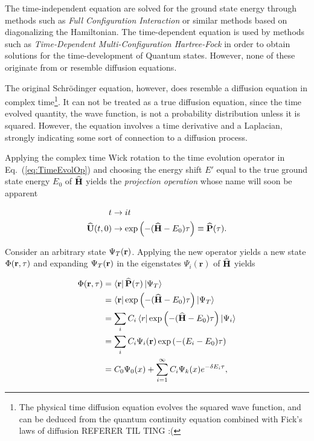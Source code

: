The time-independent equation are solved for the ground state energy through methods such as \textit{Full Configuration Interaction} or similar methods based on diagonalizing the Hamiltonian. The time-dependent equation is used by methods such as \textit{Time-Dependent Multi-Configuration Hartree-Fock} in order to obtain solutions for the time-development of Quantum states. However, none of these originate from or resemble diffusion equations. 

The original Schrödinger equation, however, does resemble a diffusion equation in complex time\footnote{The physical time diffusion equation evolves the squared wave function, and can be deduced from the quantum continuity equation combined with Fick's laws of diffusion REFERER TIL TING :(}. It can not be treated as a true diffusion equation, since the time evolved quantity, the wave function, is not a probability distribution unless it is squared. However, the equation involves a time derivative and a Laplacian, strongly indicating some sort of connection to a diffusion process.

Applying the complex time Wick rotation to the time evolution operator in Eq.~(\ref{eq:TimeEvolOp}) and choosing the energy shift $E'$ equal to the true ground state energy $E_0$ of ${\bf\widehat{H}}$ yields the \textit{projection operation} whose name will soon be apparent

\begin{align}
t &\to it \notag\\
{\bf\widehat{U}}(t, 0) &\to \exp\left(-({\bf\widehat{H}} - E_0)\tau\right) \equiv {\bf\widehat{P}}(\tau).\notag
\end{align}

Consider an arbitrary state $\Psi_T(\mathbf{r})$. Applying the new operator yields a new state $\Phi(\mathbf{r}, \tau)$ and expanding $\Psi_T(\mathbf{r})$ in the eigenstates $\Psi_i(\mathbf{r})$ of ${\bf\widehat{H}}$ yields

\begin{align}
 \Phi(\mathbf{r}, \tau) &= \left< \mathbf{r} \right|{\bf\widehat{P}}(\tau)\left| \Psi_T \right> \label{eq:projOPonTrial}\\
       &= \left< \mathbf{r} \right|\exp\left(-({\bf\widehat{H}} - E_0)\tau\right)\left| \Psi_T \right> \notag\\
       &= \sum_iC_i\left< r \right|\exp\left(-({\bf\widehat{H}} - E_0)\tau\right)\left| \Psi_i \right>\notag \\
       &= \sum_iC_i\Psi_i(\mathbf{r})\exp\left(-(E_i - E_0)\tau\right) \notag \\
       &= C_0\Psi_0(x) + \sum_{i=1}^{\infty} C_i\Psi_k(x)e^{-\delta E_i\tau}, \label{eq:schrodGeneralSolution2}
\end{align}

